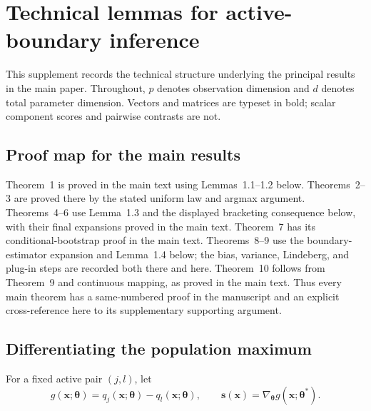 \section{Technical lemmas for active-boundary inference}

This supplement records the technical structure underlying the principal
results in the main paper.  Throughout, $p$ denotes observation dimension and
$d$ denotes total parameter dimension.  Vectors and matrices are typeset in
bold; scalar component scores and pairwise contrasts are not.

\subsection{Proof map for the main results}

Theorem~1 is proved in the main text using Lemmas~1.1--1.2 below.
Theorems~2--3 are proved there by the stated uniform law and argmax argument.
Theorems~4--6 use Lemma~1.3 and the displayed bracketing consequence below,
with their final expansions proved in the main text. Theorem~7 has its
conditional-bootstrap proof in the main text. Theorems~8--9 use the boundary-
estimator expansion and Lemma~1.4 below; the bias, variance, Lindeberg, and
plug-in steps are recorded both there and here. Theorem~10 follows from
Theorem~9 and continuous mapping, as proved in the main text. Thus every main
theorem has a same-numbered proof in the manuscript and an explicit
cross-reference here to its supplementary supporting argument.

\subsection{Differentiating the population maximum}

For a fixed active pair $(j,l)$, let
\[
 g(\mathbf{x};\boldsymbol{\theta})
 =q_j(\mathbf{x};\boldsymbol{\theta})
  -q_l(\mathbf{x};\boldsymbol{\theta}),
 \qquad
 \mathbf{s}(\mathbf{x})
 =\nabla_{\boldsymbol{\theta}}
   g(\mathbf{x};\boldsymbol{\theta}^*).
\]


